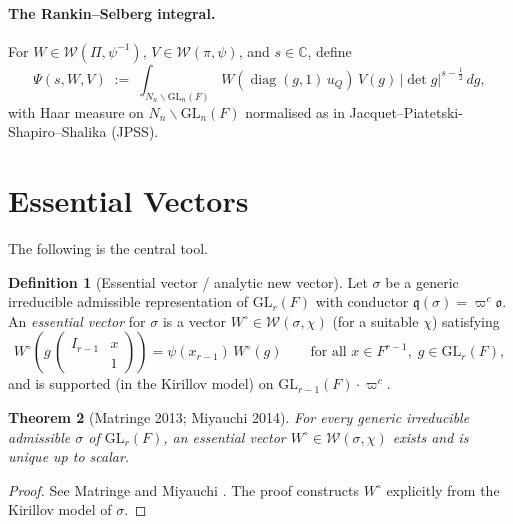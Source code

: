 \documentclass[12pt]{article}
\newtheorem{theorem}{Theorem}
\theoremstyle{definition}
\newtheorem{definition}[theorem]{Definition}
\theoremstyle{remark}
\DeclareMathOperator{\diag}{diag}
\begin{document}
\paragraph{The Rankin--Selberg integral.}
For $W\in\mathcal{W}(\Pi,\psi^{-1})$, $V\in\mathcal{W}(\pi,\psi)$, and
$s\in\mathbb{C}$, define
\begin{equation}\label{eq:RS}
  \Psi(s,W,V)
  \;:=\;
  \int_{N_n\backslash\mathrm{GL}_n(F)}
    W\!\left(\diag(g,1)\,u_Q\right)\,
    V(g)\,|\det g|^{s-\frac12}\,dg,
\end{equation}
with Haar measure on $N_n\backslash\mathrm{GL}_n(F)$ normalised as in
Jacquet--Piatetski-Shapiro--Shalika (JPSS).

\section{Essential Vectors}

The following is the central tool.

\begin{definition}[Essential vector / analytic new vector]
\label{def:ev}
Let $\sigma$ be a generic irreducible admissible representation of
$\mathrm{GL}_r(F)$ with conductor $\mathfrak{q}(\sigma)=\varpi^c\mathfrak{o}$.
An \emph{essential vector} for $\sigma$ is a vector
$W^\circ\in\mathcal{W}(\sigma,\chi)$ (for a suitable $\chi$) satisfying
\begin{equation}\label{eq:ev-def}
  W^\circ\!\left(g\,\begin{pmatrix}I_{r-1} & x\\ & 1\end{pmatrix}\right)
  = \psi(x_{r-1})\,W^\circ(g)
  \qquad\text{for all } x\in F^{r-1},\; g\in\mathrm{GL}_r(F),
\end{equation}
and is supported (in the Kirillov model) on $\mathrm{GL}_{r-1}(F)\cdot\varpi^c$.
\end{definition}

\begin{theorem}[Matringe 2013; Miyauchi 2014]\label{thm:ev}
For every generic irreducible admissible $\sigma$ of $\mathrm{GL}_r(F)$, an
essential vector $W^\circ\in\mathcal{W}(\sigma,\chi)$ exists and is unique up
to scalar.
\end{theorem}

\begin{proof}
See Matringe \cite{Matringe2013} and Miyauchi \cite{Miyauchi2014}.  The proof
constructs $W^\circ$ explicitly from the Kirillov model of $\sigma$.
\end{proof}
\end{document}

